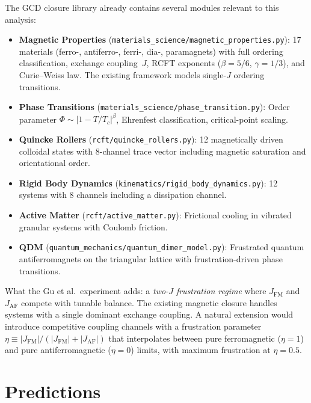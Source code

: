 \documentclass[
  aps,
  prd,
  twocolumn,
  superscriptaddress,
  nofootinbib,
  floatfix
]{revtex4-2}
\newcommand{\AF}{\mathrm{AF}}
\newcommand{\FM}{\mathrm{FM}}
\begin{document}
The GCD closure library already contains several modules
relevant to this analysis:

\begin{itemize}[nosep]
  \item \textbf{Magnetic Properties}
    (\texttt{materials\_science/magnetic\_properties.py}):
    17 materials (ferro-, antiferro-, ferri-, dia-, paramagnets)
    with full ordering classification, exchange coupling~$J$,
    RCFT exponents ($\beta=5/6$, $\gamma=1/3$), and
    Curie--Weiss law.  The existing framework models
    single-$J$ ordering transitions.
  \item \textbf{Phase Transitions}
    (\texttt{materials\_science/phase\_transition.py}):
    Order parameter $\Phi \sim |1 - T/T_c|^\beta$,
    Ehrenfest classification, critical-point scaling.
  \item \textbf{Quincke Rollers}
    (\texttt{rcft/quincke\_rollers.py}): 12 magnetically
    driven colloidal states with 8-channel trace vector
    including magnetic saturation and orientational order.
  \item \textbf{Rigid Body Dynamics}
    (\texttt{kinematics/rigid\_body\_dynamics.py}):
    12 systems with 8 channels including a
    dissipation channel.
  \item \textbf{Active Matter}
    (\texttt{rcft/active\_matter.py}): Frictional cooling
    in vibrated granular systems with Coulomb friction.
  \item \textbf{QDM} (\texttt{quantum\_mechanics/quantum\_dimer\_model.py}):
    Frustrated quantum antiferromagnets on the triangular
    lattice with frustration-driven phase transitions.
\end{itemize}

What the Gu et al.\ experiment adds: a \emph{two-$J$
frustration regime} where $J_{\FM}$ and $J_{\AF}$ compete
with tunable balance.  The existing magnetic closure handles
systems with a single dominant exchange coupling.  A natural
extension would introduce competitive coupling channels
with a frustration parameter
$\eta \equiv |J_{\FM}|/(|J_{\FM}| + |J_{\AF}|)$
that interpolates between pure ferromagnetic ($\eta{=}1$)
and pure antiferromagnetic ($\eta{=}0$) limits, with
maximum frustration at $\eta = 0.5$.

\section{Predictions}\label{sec:predictions}
\end{document}
